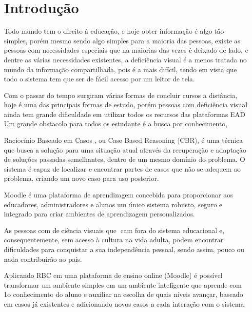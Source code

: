\section{Introdução}
Todo mundo tem o direito à educação, e hoje obter informação é algo tão simples, 
porém mesmo sendo algo simples para a maioria das pessoas, existe as pessoas com 
necessidades especiais que na maiorias das vezes é deixado de lado, e dentre as 
várias necessidades existentes, a deficiência visual é a menos tratada no mundo 
da informação compartilhada, pois é a mais difícil, tendo em vista que todo o sistema 
tem que ser de fácil acesso por um leitor de tela.

Com o passar do tempo surgiram várias formas de concluir cursos a distância,
hoje é uma das principais formas de estudo, porém pessoas com deficiência visual
ainda tem grande dificuldade em utilizar todos os recursos das plataformas EAD
Um grande obstacolo para todos os estudante é a busca por conhecimento,

Raciocínio Baseado em Casos , ou Case Based Reasoning (CBR), é uma técnica
que busca a solução para uma situação atual através da recuperação e adaptação
de soluções passadas semelhantes, dentro de um mesmo domínio do problema.
O sistema é capaz de localizar e encontrar partes de casos que não se adequem
ao problema, criando um novo caso para uso posterior. \cite{Fernandes}

Moodle é uma plataforma de aprendizagem concebida para proporcionar
aos educadores, administradores e alunos um único sistema robusto, seguro e
integrado para criar ambientes de aprendizagem personalizados. \cite{Moodle}

As pessoas com deciência visuais que cam fora do sistema educacional
e, consequentemente, sem acesso à cultura na vida adulta, podem encontrar
dificuldades para conquistar a sua independência pessoal, sendo assim, pouco
ou nada contribuirão ao país.

Aplicando RBC em uma plataforma de ensino online (Moodle) é possível
transformar um ambiente simples em um ambiente inteligente que aprende com
1o conhecimento do aluno e auxiliar na escolha de quais níveis avançar, baseado
em casos já existentes e adicionando novos casos a cada interação com o sistema.